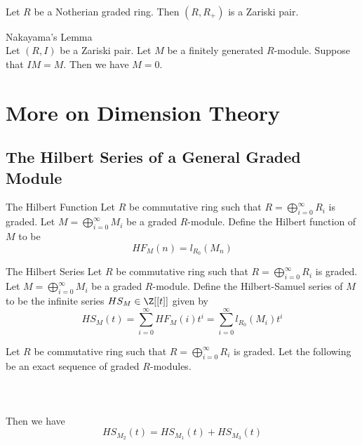 \documentclass[a4paper]{article}
\begin{document}
\begin{lmm}{}{}\\
Let $R$ be a Notherian graded ring. Then $(R,R_+)$ is a Zariski pair. 
\end{lmm}

\begin{thm}{Nakayama's Lemma}{}\\
Let $(R,I)$ be a Zariski pair. Let $M$ be a finitely generated $R$-module. Suppose that $IM=M$. Then we have $M=0$. 
\end{thm}

\pagebreak
\section{More on Dimension Theory}
\subsection{The Hilbert Series of a General Graded Module}
\begin{defn}{The Hilbert Function}{} Let $R$ be commutative ring such that $R=\bigoplus_{i=0}^\infty R_i$ is graded. Let $M=\bigoplus_{i=0}^\infty M_i$ be a graded $R$-module. Define the Hilbert function of $M$ to be $$HF_M(n)=l_{R_0}(M_n)$$
\end{defn}

\begin{defn}{The Hilbert Series}{} Let $R$ be commutative ring such that $R=\bigoplus_{i=0}^\infty R_i$ is graded. Let $M=\bigoplus_{i=0}^\infty M_i$ be a graded $R$-module. Define the Hilbert-Samuel series of $M$ to be the infinite series $HS_M\in\Z[[t]]$ given by $$HS_M(t)=\sum_{i=0}^\infty HF_M(i)t^i=\sum_{i=0}^\infty l_{R_0}(M_i)t^i$$
\end{defn}

\begin{prp}{}{} Let $R$ be commutative ring such that $R=\bigoplus_{i=0}^\infty R_i$ is graded. Let the following be an exact sequence of graded $R$-modules. \\~\\
\\~\\
Then we have $$HS_{M_2}(t)=HS_{M_1}(t)+HS_{M_3}(t)$$
\end{prp}
\end{document}
